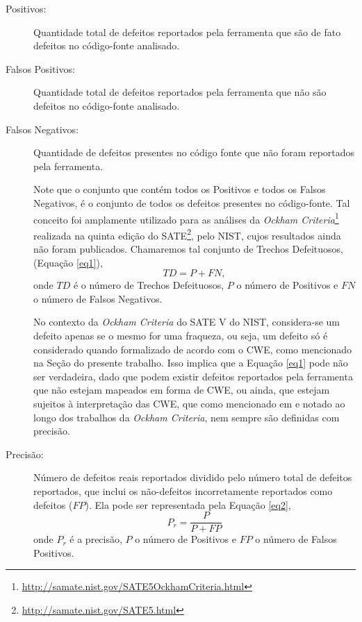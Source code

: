 \begin{description}
    \item[Positivos:] Quantidade total de defeitos reportados pela ferramenta que são de fato defeitos no código-fonte analisado.

    \item[Falsos Positivos:] Quantidade total de defeitos reportados pela ferramenta que não são defeitos no código-fonte analisado.

    \item[Falsos Negativos:] Quantidade de defeitos presentes no código fonte que não foram reportados pela ferramenta.

      Note que o conjunto que contém todos os Positivos e todos os Falsos Negativos, é o conjunto de todos os defeitos presentes no código-fonte. Tal conceito foi amplamente utilizado para as análises da \textit{Ockham Criteria}\footnote{\url{http://samate.nist.gov/SATE5OckhamCriteria.html}} realizada na quinta edição do SATE\footnote{\url{http://samate.nist.gov/SATE5.html}}, pelo NIST, cujos resultados ainda não foram publicados. Chamaremos tal conjunto de Trechos Defeituosos, (Equação \eqref{eq1}),
\begin{equation}\label{eq1}
TD = P + FN,
\end{equation}
  onde $TD$ é o número de Trechos Defeituosos, $P$ o número de Positivos e $FN$ o número de Falsos Negativos.

  No contexto da \textit{Ockham Criteria} do SATE V do NIST, considera-se um defeito apenas se o mesmo for uma fraqueza, ou seja, um defeito só é considerado quando formalizado de acordo com o CWE, como mencionado   na Seção  do presente trabalho. Isso implica que a Equação \eqref{eq1} pode não ser verdadeira, dado que podem existir defeitos reportados pela ferramenta que não estejam mapeados em forma de CWE, ou ainda, que estejam sujeitos à interpretação das CWE, que como mencionado em \cite{yan} e notado ao longo dos trabalhos  da \textit{Ockham Criteria}, nem sempre são definidas com precisão.

\item[Precisão:] Número de defeitos reais reportados dividido pelo número total de defeitos reportados, que inclui os não-defeitos incorretamente reportados como defeitos ($FP$).  Ela pode ser representada pela Equação \eqref{eq2},
\begin{equation}\label{eq2}
  P_r = \frac{P}{P + FP}
\end{equation}
  onde $P_r$ é a precisão, $P$ o número de Positivos e $FP$ o número de Falsos Positivos.


\end{description}
